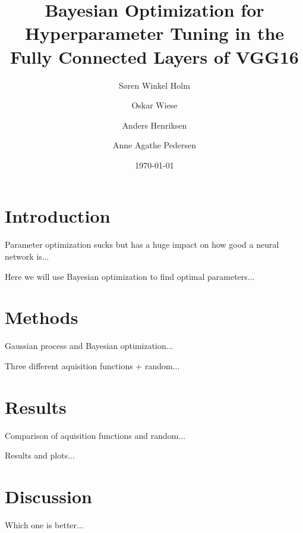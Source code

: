 \documentclass[12pt,fleqn,]{article}
\title{Bayesian Optimization for Hyperparameter Tuning in the Fully Connected Layers of VGG16}
\author{Søren Winkel Holm\and Oskar Wiese\and Anders Henriksen\and Anne Agathe Pedersen}
\date{\today}
\begin{document}
\maketitle

\tableofcontents


\section{Introduction}
Parameter optimization sucks but has a huge impact on how good a neural network is...

Here we will use Bayesian optimization to find optimal parameters...


\section{Methods}
Gaussian process and Bayesian optimization...

Three different aquisition functions + random...


\section{Results}
Comparison of aquisition functions and random...

Results and plots...


\section{Discussion}
Which one is better...
\end{document}

